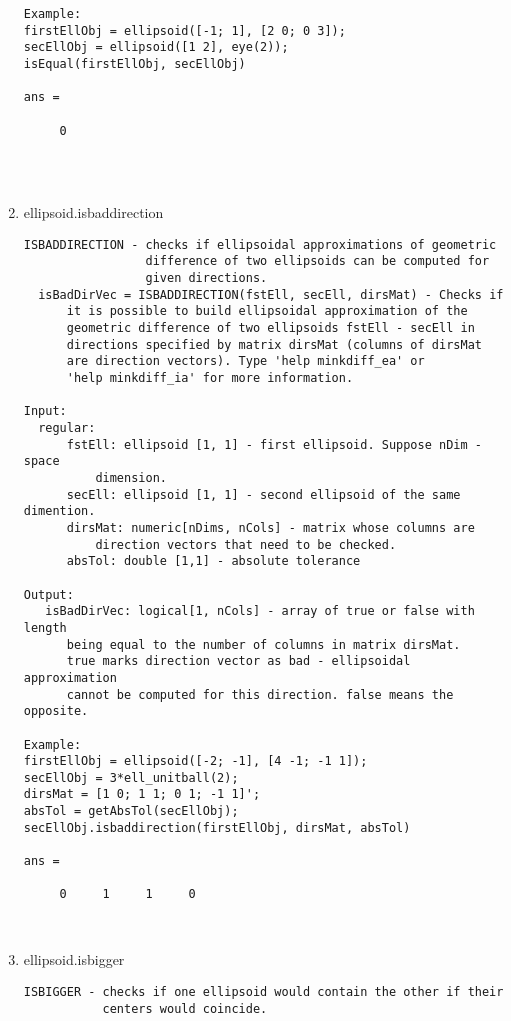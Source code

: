 \begin{enumerate}
\begin{lstlisting}
Example:
firstEllObj = ellipsoid([-1; 1], [2 0; 0 3]);
secEllObj = ellipsoid([1 2], eye(2));
isEqual(firstEllObj, secEllObj)

ans =

     0




\end{lstlisting}
\fontfamily{\familydefault}
\selectfont
\item {ellipsoid.isbaddirection}
\selectfont
\begin{lstlisting}
ISBADDIRECTION - checks if ellipsoidal approximations of geometric
                 difference of two ellipsoids can be computed for
                 given directions.
  isBadDirVec = ISBADDIRECTION(fstEll, secEll, dirsMat) - Checks if
      it is possible to build ellipsoidal approximation of the
      geometric difference of two ellipsoids fstEll - secEll in
      directions specified by matrix dirsMat (columns of dirsMat
      are direction vectors). Type 'help minkdiff_ea' or
      'help minkdiff_ia' for more information.

Input:
  regular:
      fstEll: ellipsoid [1, 1] - first ellipsoid. Suppose nDim - space
          dimension.
      secEll: ellipsoid [1, 1] - second ellipsoid of the same dimention.
      dirsMat: numeric[nDims, nCols] - matrix whose columns are
          direction vectors that need to be checked.
      absTol: double [1,1] - absolute tolerance

Output:
   isBadDirVec: logical[1, nCols] - array of true or false with length
      being equal to the number of columns in matrix dirsMat.
      true marks direction vector as bad - ellipsoidal approximation
      cannot be computed for this direction. false means the opposite.

Example:
firstEllObj = ellipsoid([-2; -1], [4 -1; -1 1]);
secEllObj = 3*ell_unitball(2);
dirsMat = [1 0; 1 1; 0 1; -1 1]';
absTol = getAbsTol(secEllObj);
secEllObj.isbaddirection(firstEllObj, dirsMat, absTol)

ans =

     0     1     1     0



\end{lstlisting}
\fontfamily{\familydefault}
\selectfont
\item {ellipsoid.isbigger}
\selectfont
\begin{lstlisting}
ISBIGGER - checks if one ellipsoid would contain the other if their
           centers would coincide.


\end{lstlisting}
\end{enumerate}
